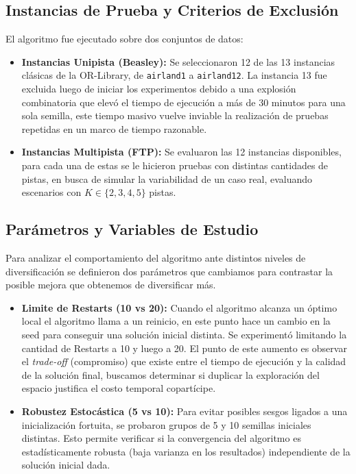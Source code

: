 \documentclass[letter, 10pt]{article}
\begin{document}
\subsection{Instancias de Prueba y Criterios de Exclusión}
El algoritmo fue ejecutado sobre dos conjuntos de datos:
\begin{itemize}
    \item \textbf{Instancias Unipista (Beasley):} Se seleccionaron 12 de las 13 instancias clásicas de la OR-Library, de \texttt{airland1} a \texttt{airland12}. La instancia 13 fue excluida luego de iniciar los experimentos debido a una explosión combinatoria que elevó el tiempo de ejecución a más de 30 minutos para una sola semilla, este tiempo masivo vuelve inviable la realización de pruebas repetidas en un marco de tiempo razonable.
    \item \textbf{Instancias Multipista (FTP):} Se evaluaron las 12 instancias disponibles, para cada una de estas se le hicieron pruebas con distintas cantidades de pistas, en busca de simular la variabilidad de un caso real, evaluando escenarios con $K\in\{2,3,4,5\}$ pistas.
\end{itemize}

\subsection{Parámetros y Variables de Estudio}
Para analizar el comportamiento del algoritmo ante distintos niveles de diversificación se definieron dos parámetros que cambiamos para contrastar la posible mejora que obtenemos de diversificar más.
\begin{itemize}
    \item \textbf{Limite de Restarts (10 vs 20):} Cuando el algoritmo alcanza un óptimo local el algoritmo llama a un reinicio, en este punto hace un cambio en la seed para conseguir una solución inicial distinta. Se experimentó limitando la cantidad de Restarts a 10 y luego a 20. El punto de este aumento es observar el \textit{trade-off} (compromiso) que existe entre el tiempo de ejecución y la calidad de la solución final, buscamos determinar si duplicar la exploración del espacio justifica el costo temporal copartícipe.
    \item \textbf{Robustez Estocástica (5 vs 10):} Para evitar posibles sesgos ligados a una inicialización fortuita, se probaron grupos de 5 y 10 semillas iniciales distintas. Esto permite verificar si la convergencia del algoritmo es estadísticamente robusta (baja varianza en los resultados) independiente de la solución inicial dada.
\end{itemize}
\end{document}
